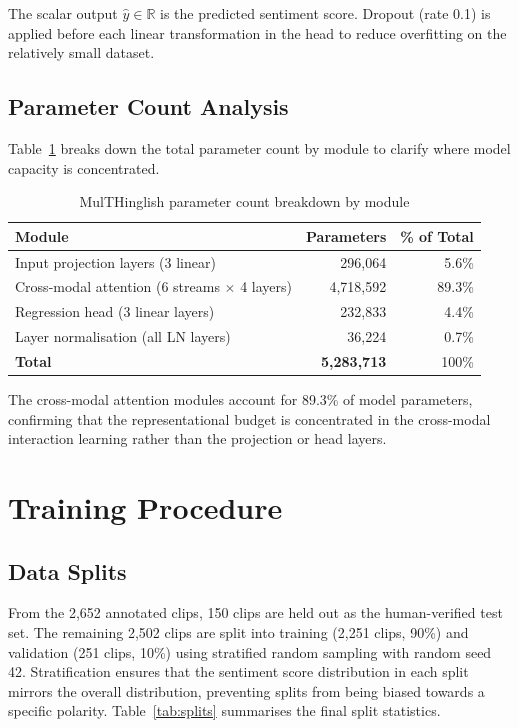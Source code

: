 The scalar output $\hat{y} \in \mathbb{R}$ is the predicted sentiment score. Dropout (rate 0.1) is applied before each linear transformation in the head to reduce overfitting on the relatively small dataset.

\subsection{Parameter Count Analysis}

Table~\ref{tab:params} breaks down the total parameter count by module to clarify where model capacity is concentrated.

\begin{table}[ht]
\centering
\caption{MulTHinglish parameter count breakdown by module}
\label{tab:params}
\renewcommand{\arraystretch}{1.3}
\begin{tabular}{lrr}
\toprule
\textbf{Module} & \textbf{Parameters} & \textbf{\% of Total} \\
\midrule
Input projection layers (3 linear) & 296,064 & 5.6\% \\
Cross-modal attention (6 streams $\times$ 4 layers) & 4,718,592 & 89.3\% \\
Regression head (3 linear layers) & 232,833 & 4.4\% \\
Layer normalisation (all LN layers) & 36,224 & 0.7\% \\
\midrule
\textbf{Total} & \textbf{5,283,713} & 100\% \\
\bottomrule
\end{tabular}
\end{table}

The cross-modal attention modules account for 89.3\% of model parameters, confirming that the representational budget is concentrated in the cross-modal interaction learning rather than the projection or head layers.

\section{Training Procedure}

\subsection{Data Splits}

From the 2,652 annotated clips, 150 clips are held out as the human-verified test set. The remaining 2,502 clips are split into training (2,251 clips, 90\%) and validation (251 clips, 10\%) using stratified random sampling with random seed 42. Stratification ensures that the sentiment score distribution in each split mirrors the overall distribution, preventing splits from being biased towards a specific polarity. Table~\ref{tab:splits} summarises the final split statistics.

